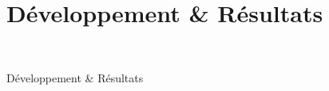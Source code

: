 \chapter*{Développement & Résultats}
\thispagestyle{plain}
~\\[1cm]
{ \large

Développement & Résultats

}
